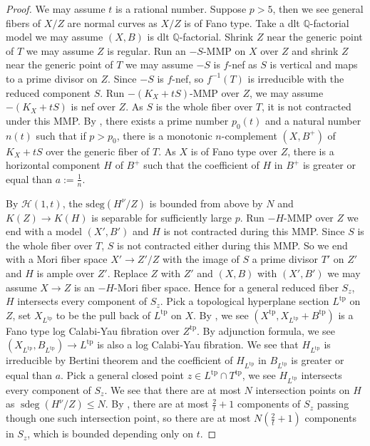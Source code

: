 \documentclass[letterpaper,reqno,12pt]{amsart}
\DeclareMathOperator{\sdeg}{sdeg}
\newcommand{\tp}{\mathrm{tp}}
\numberwithin{equation}{section}
\theoremstyle{plain}
\begin{document}
\begin{proof}
    We may assume $t$ is a rational number. Suppose $p>5$, then we see general fibers of $X/Z$ are normal curves as $X/Z$ is of Fano type. Take a dlt $\mathbb Q$-factorial model we may assume $(X,B)$ is dlt $\mathbb Q$-factorial. Shrink $Z$ near the generic point of $T$ we may assume $Z$ is regular. Run an $-S$-MMP  on $X$ over $Z$ and shrink $Z$ near the generic point of $T$ we may assume $-S$ is $f$-nef as $S$ is vertical and maps to a prime divisor on $Z$. Since $-S$ is $f$-nef, so $f^{-1}(T)$ is irreducible with the reduced component $S$. Run $-(K_X+tS)$-MMP over $Z$, we may assume $-(K_X+tS)$ is nef over $Z$. As $S$ is the whole fiber over $T$, it is not contracted under this MMP. By \cite[Theorem 1.7]{complement1}, there exists a prime number $p_0(t)$ and a natural number $n(t)$  such that if $p>p_0$, there is a monotonic $n$-complement $(X,B^+)$ of $K_X+tS$ over the generic fiber of $T$. As $X$ is of Fano type over $Z$, there is a horizontal component $H$ of $B^+$ such that the coefficient of $H$ in $B^+$ is greater or equal than $a:=\frac{1}{n}$. 

    By $\mathcal H(1,t)$, the $\text{sdeg}(H^\nu/Z)$ is bounded from above by $N$ and $K(Z)\to K(H)$ is separable for sufficiently large $p$. Run $-H$-MMP over $Z$ we end with a model $(X',B')$ and $H$ is not contracted during this MMP. Since $S$ is the whole fiber over $T$, $S$ is not contracted either during this MMP. So we end with a Mori fiber space $X'\to Z'/Z$ with the image of $S$ a prime divisor $T'$ on $Z'$ and $H$ is ample over $Z'$. Replace $Z$ with $Z'$ and $(X,B)$ with $(X',B')$ we may assume $X\to Z$ is an $-H$-Mori fiber space. Hence for a general reduced fiber $S_z$, $H$ intersects every component of $S_z$. Pick a topological hyperplane section $L^\tp$ on $Z$, set $X_{L^\tp}$ to be the pull back of $L^\tp$ on $X$. By , we see $(X^\tp,X_{L^\tp}+B^\tp)$ is a Fano type log Calabi-Yau fibration over $Z^\tp$. By adjunction formula, we see $(X_{L^\tp},B_{L^\tp})\to L^\tp$ is also a log Calabi-Yau fibration. We see that $H_{L^\tp}$ is irreducible by Bertini theorem and the coefficient of $H_{L^\tp}$ in $B_{L^\tp}$ is greater or equal than $a$. Pick a general closed point $z\in {L^\tp}\cap T^\tp$, we see $H_{L^\tp}$ intersects every component of $S_z$. We see that there are at most $N$ intersection points on $H$ as $\sdeg(H^\nu/Z)\leq N$. By , there are at most $\frac{2}{t}+1$ components of $S_z$ passing though one such intersection point, so there are at most $N(\frac{2}{t}+1)$ components in $S_z$, which is bounded depending only on $t$.
\end{proof}


\end{document}

